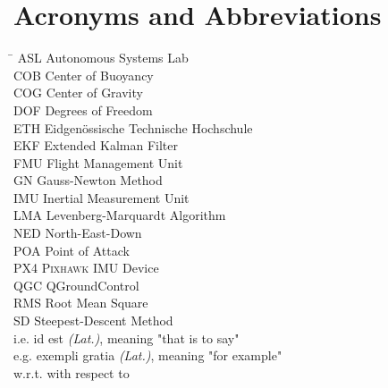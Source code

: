 \section*{Acronyms and Abbreviations}

\begin{tabbing}
 \hspace*{1.6cm}  \= \kill
 ASL \> Autonomous Systems Lab \\[0.5ex]
 COB \> Center of Buoyancy \\[0.5ex]
 COG \> Center of Gravity \\[0.5ex]
 DOF \> Degrees of Freedom\\[0.5ex]
 ETH \> Eidgenössische Technische Hochschule \\[0.5ex]
 EKF \> Extended Kalman Filter \\[0.5ex]
 FMU \> Flight Management Unit \\[0.5ex]
 GN  \> Gauss-Newton Method \\[0.5ex]
 IMU \> Inertial Measurement Unit \\[0.5ex]
 LMA \> Levenberg-Marquardt Algorithm \\[0.5ex]
 NED \> North-East-Down \\[0.5ex]
 POA \> Point of Attack \\[0.5ex]
 PX4 \> \textsc{Pixhawk} IMU Device \\[0.5ex]
 QGC \> QGroundControl \\[0.5ex]
 RMS \> Root Mean Square\\[0.5ex]
 SD  \> Steepest-Descent Method \\[0.5ex]
 i.e.   \> id est \textit{(Lat.)}, meaning "that is to say" \\[0.5ex]
 e.g.   \> exempli gratia \textit{(Lat.)}, meaning "for example" \\[0.5ex]
 w.r.t. \> with respect to \\[0.5ex]
 
\end{tabbing}
